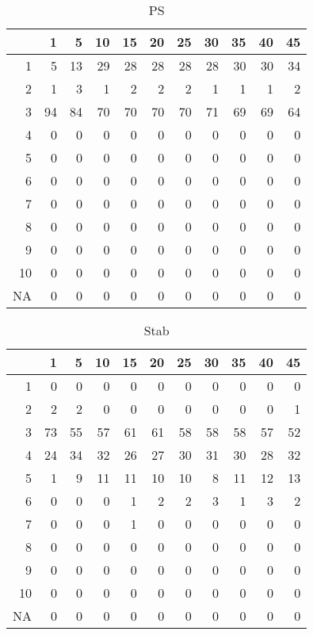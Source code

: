 \documentclass[11pt]{article}
\begin{document}
\begin{table}[H]
\centering
\begin{tabular}{rrrrrrrrrrr}
  \hline
 & 1 & 5 & 10 & 15 & 20 & 25 & 30 & 35 & 40 & 45 \\ 
  \hline
1 & 5 & 13 & 29 & 28 & 28 & 28 & 28 & 30 & 30 & 34 \\ 
  2 & 1 & 3 & 1 & 2 & 2 & 2 & 1 & 1 & 1 & 2 \\ 
  3 & 94 & 84 & 70 & 70 & 70 & 70 & 71 & 69 & 69 & 64 \\ 
  4 & 0 & 0 & 0 & 0 & 0 & 0 & 0 & 0 & 0 & 0 \\ 
  5 & 0 & 0 & 0 & 0 & 0 & 0 & 0 & 0 & 0 & 0 \\ 
  6 & 0 & 0 & 0 & 0 & 0 & 0 & 0 & 0 & 0 & 0 \\ 
  7 & 0 & 0 & 0 & 0 & 0 & 0 & 0 & 0 & 0 & 0 \\ 
  8 & 0 & 0 & 0 & 0 & 0 & 0 & 0 & 0 & 0 & 0 \\ 
  9 & 0 & 0 & 0 & 0 & 0 & 0 & 0 & 0 & 0 & 0 \\ 
  10 & 0 & 0 & 0 & 0 & 0 & 0 & 0 & 0 & 0 & 0 \\ 
  NA & 0 & 0 & 0 & 0 & 0 & 0 & 0 & 0 & 0 & 0 \\ 
   \hline
\end{tabular}
\caption{PS} 
\end{table}
\begin{table}[H]
\centering
\begin{tabular}{rrrrrrrrrrr}
  \hline
 & 1 & 5 & 10 & 15 & 20 & 25 & 30 & 35 & 40 & 45 \\ 
  \hline
1 & 0 & 0 & 0 & 0 & 0 & 0 & 0 & 0 & 0 & 0 \\ 
  2 & 2 & 2 & 0 & 0 & 0 & 0 & 0 & 0 & 0 & 1 \\ 
  3 & 73 & 55 & 57 & 61 & 61 & 58 & 58 & 58 & 57 & 52 \\ 
  4 & 24 & 34 & 32 & 26 & 27 & 30 & 31 & 30 & 28 & 32 \\ 
  5 & 1 & 9 & 11 & 11 & 10 & 10 & 8 & 11 & 12 & 13 \\ 
  6 & 0 & 0 & 0 & 1 & 2 & 2 & 3 & 1 & 3 & 2 \\ 
  7 & 0 & 0 & 0 & 1 & 0 & 0 & 0 & 0 & 0 & 0 \\ 
  8 & 0 & 0 & 0 & 0 & 0 & 0 & 0 & 0 & 0 & 0 \\ 
  9 & 0 & 0 & 0 & 0 & 0 & 0 & 0 & 0 & 0 & 0 \\ 
  10 & 0 & 0 & 0 & 0 & 0 & 0 & 0 & 0 & 0 & 0 \\ 
  NA & 0 & 0 & 0 & 0 & 0 & 0 & 0 & 0 & 0 & 0 \\ 
   \hline
\end{tabular}
\caption{Stab} 
\end{table}
\end{document}
